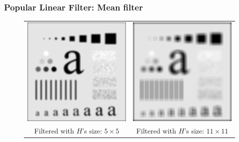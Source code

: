 \documentclass[english,11pt,table,handout]{beamer}
\begin{document}
\frame
{
	\frametitle{Popular Linear Filter: Mean filter}
	\begin{figure}
		\begin{tabular}{cc}
			\includegraphics[scale=0.53]{char_mean_5_5.png} &
			\includegraphics[scale=0.53]{char_mean_11_11.png} \\
			Filtered with $H$'s size: $5 \times 5$ & Filtered with $H$'s size: $11 \times 11$ 
		\end{tabular}
	\end{figure}
}
\end{document}
